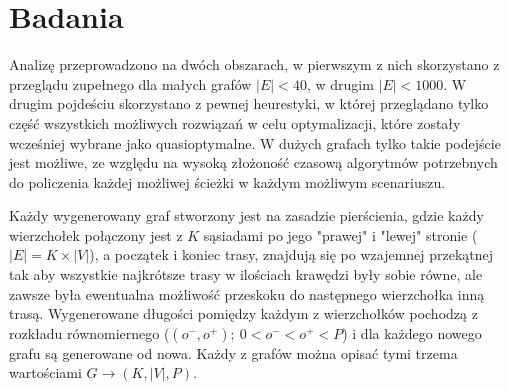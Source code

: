 \documentclass[10pt]{article}
\begin{document}
\section{Badania}
Analizę przeprowadzono na dwóch obszarach, w pierwszym z nich skorzystano z przeglądu zupełnego dla małych grafów $|E| < 40$, w drugim $|E| < 1000$. W drugim pojdeściu skorzystano z pewnej heurestyki, w której przeglądano tylko część wszystkich możliwych rozwiązań w celu optymalizacji, które zostały wcześniej wybrane jako quasioptymalne. W dużych grafach tylko takie podejście jest możliwe, ze względu na wysoką złożoność czasową algorytmów potrzebnych do policzenia każdej możliwej ścieżki w każdym możliwym scenariuszu.

Każdy wygenerowany graf stworzony jest na zasadzie pierścienia, gdzie każdy wierzchołek połączony jest z $K$ sąsiadami po jego "prawej" i "lewej" stronie ($|E| = K \times |V|$), a początek i koniec trasy, znajdują się po wzajemnej przekątnej tak aby wszystkie najkrótsze trasy w ilościach krawędzi były sobie równe, ale zawsze była ewentualna możliwość przeskoku do następnego wierzchołka inną trasą. Wygenerowane długości pomiędzy każdym z wierzchołków pochodzą z rozkładu równomiernego ($\left(o^-,  o^+\right);\ 0 < o^- < o^+ < P$) i dla każdego nowego grafu są generowane od nowa. Każdy z grafów można opisać tymi trzema wartościami $G \rightarrow (K, |V|, P)$.
\end{document}
